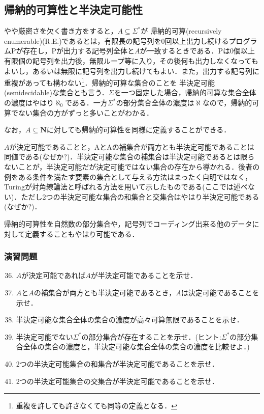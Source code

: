 \documentclass{ltjsarticle}
\theoremstyle{mystyle1}
\theoremstyle{mystyle3}
\theoremstyle{mystyle2}
\newcommand{\bN}{\ensuremath{\mathbf{N}}}
\newcommand{\red}[1]{{\color{red} #1}}
\begin{document}
\subsection{帰納的可算性と半決定可能性}
やや厳密さを欠く書き方をすると，$A\subseteq\Sigma^\ast$が\red{帰納的可算}(recursively enumerable)(R.E.)であるとは，有限長の記号列を0回以上出力し続けるプログラムPが存在し，Pが出力する記号列全体と$A$が一致するときである．Pは0個以上有限個の記号列を出力後，無限ループ等に入り，その後何も出力しなくなってもよいし，あるいは無限に記号列を出力し続けてもよい．また，出力する記号列に重複があっても構わない\footnote{重複を許しても許さなくても同等の定義となる．}．帰納的可算な集合のことを\red{半決定可能}(semidecidable)な集合とも言う．$\Sigma$を一つ固定した場合，帰納的可算な集合全体の濃度はやはり$\aleph_0$である．一方$\Sigma^\ast$の部分集合全体の濃度は$\aleph$なので，帰納的可算でない集合の方がずっと多いことがわかる．

なお，$A\subseteq\bN$に対しても帰納的可算性を同様に定義することができる．

$A$が決定可能であることと，AとAの補集合が両方とも半決定可能であることは同値である(なぜか?)．半決定可能な集合の補集合は半決定可能であるとは限らないことが，半決定可能だが決定可能ではない集合の存在から導かれる．後者の例をある条件を満たす要素の集合として与える方法はまったく自明ではなく，Turingが対角線論法と呼ばれる方法を用いて示したものである(ここでは述べない)．ただし2つの半決定可能な集合の和集合と交集合はやはり半決定可能である(なぜか?)．

帰納的可算性を自然数の部分集合や，記号列でコーディング出来る他のデータに対して定義することもやはり可能である．
\subsubsection*{演習問題}
\begin{enumerate}
  \setcounter{enumi}{35}
  \item $A$が決定可能であれば$A$が半決定可能であることを示せ．
  \item $A$と$A$の補集合が両方とも半決定可能であるとき，$A$は決定可能であることを示せ．
  \item 半決定可能な集合全体の集合の濃度が高々可算無限であることを示せ．
  \item 半決定可能でない$\Sigma^\ast$の部分集合が存在することを示せ．(ヒント:$\Sigma^\ast$の部分集合全体の集合の濃度と，半決定可能な集合全体の集合の濃度を比較せよ．)
  \item 2つの半決定可能集合の和集合が半決定可能であることを示せ．
  \item 2つの半決定可能集合の交集合が半決定可能であることを示せ．
\end{enumerate}
\end{document}
